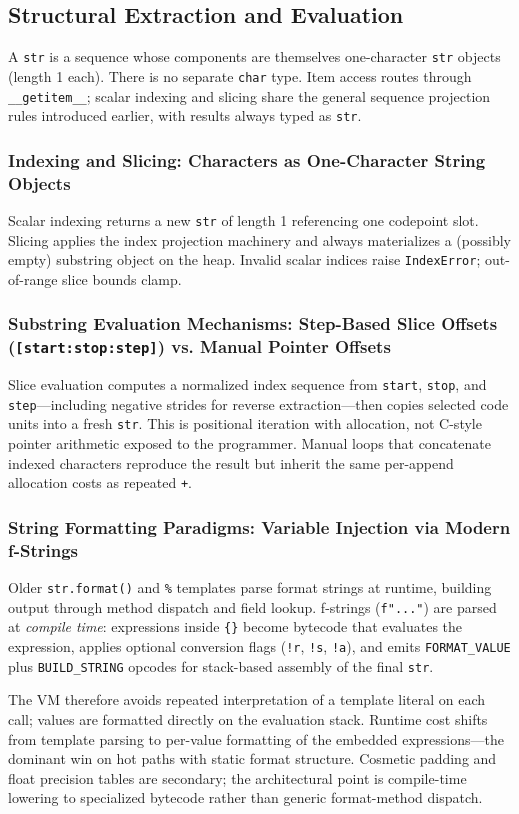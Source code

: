 \subsection{Structural Extraction and Evaluation}

A \texttt{str} is a sequence whose components are themselves one-character \texttt{str} objects (length 1 each). There is no separate \texttt{char} type. Item access routes through \texttt{\_\_getitem\_\_}; scalar indexing and slicing share the general sequence projection rules introduced earlier, with results always typed as \texttt{str}.

\subsubsection{Indexing and Slicing: Characters as One-Character String Objects}

Scalar indexing returns a new \texttt{str} of length 1 referencing one codepoint slot. Slicing applies the index projection machinery and always materializes a (possibly empty) substring object on the heap. Invalid scalar indices raise \texttt{IndexError}; out-of-range slice bounds clamp.

\subsubsection{Substring Evaluation Mechanisms: Step-Based Slice Offsets (\texttt{[start:stop:step]}) vs. Manual Pointer Offsets}

Slice evaluation computes a normalized index sequence from \texttt{start}, \texttt{stop}, and \texttt{step}---including negative strides for reverse extraction---then copies selected code units into a fresh \texttt{str}. This is positional iteration with allocation, not C-style pointer arithmetic exposed to the programmer. Manual loops that concatenate indexed characters reproduce the result but inherit the same per-append allocation costs as repeated \texttt{+}.

\subsubsection{String Formatting Paradigms: Variable Injection via Modern f-Strings}

Older \texttt{str.format()} and \texttt{\%} templates parse format strings at runtime, building output through method dispatch and field lookup. f-strings (\texttt{f"..."}) are parsed at \emph{compile time}: expressions inside \texttt{\{\}} become bytecode that evaluates the expression, applies optional conversion flags (\texttt{!r}, \texttt{!s}, \texttt{!a}), and emits \texttt{FORMAT\_VALUE} plus \texttt{BUILD\_STRING} opcodes for stack-based assembly of the final \texttt{str}.

The VM therefore avoids repeated interpretation of a template literal on each call; values are formatted directly on the evaluation stack. Runtime cost shifts from template parsing to per-value formatting of the embedded expressions---the dominant win on hot paths with static format structure. Cosmetic padding and float precision tables are secondary; the architectural point is compile-time lowering to specialized bytecode rather than generic format-method dispatch.
